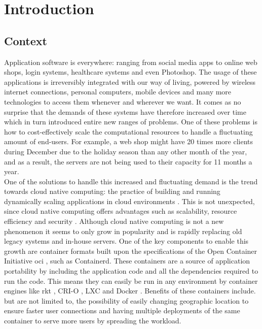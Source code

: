 \chapter{Introduction}                                 \label{ch:introduction}




\section{Context}  \label{sec:context}
Application software is everywhere: ranging from social media apps to online web shops, login systems, healthcare systems and even Photoshop. The usage of these applications is irreversibly integrated with our way of living, powered by wireless internet connections, personal computers, mobile devices and many more technologies to access them whenever and wherever we want. It comes as no surprise that the demands of these systems have therefore increased over time which in turn introduced entire new ranges of problems. One of these problems is how to cost-effectively scale the computational resources to handle a fluctuating amount of end-users. For example, a web shop might have 20 times more clients during December due to the holiday season than any other month of the year, and as a result, the servers are not being used to their capacity for 11 months a year.
\\[10pt]

 One of the solutions to handle this increased and fluctuating demand is the trend towards cloud native computing: the practice of building and running dynamically scaling applications in cloud environments \cite{CNCF}. This is not unexpected, since cloud native computing offers advantages such as scalability, resource efficiency and security \cite{cnci4}. Although cloud native computing is not a new phenomenon it seems to only grow in popularity \cite{CNCFSurvey} and is rapidly replacing old legacy systems and in-house servers. One of the key components to enable this growth are container formats built upon the specifications of the Open Container Initiative \acrshort{oci} \cite{OCI}, such as Containerd. These containers are a source of application portability by including the application code and all the dependencies required to run the code. This means they can easily be run in any environment by container engines like rkt \cite{rkt}, CRI-O \cite{crio}, LXC \cite{LXC} and Docker \cite{Bernstein2014}. Benefits of these containers include. but are not limited to, the possibility of easily changing geographic location to ensure faster user connections and having multiple deployments of the same container to serve more users by spreading the workload. 
\\[10pt]

